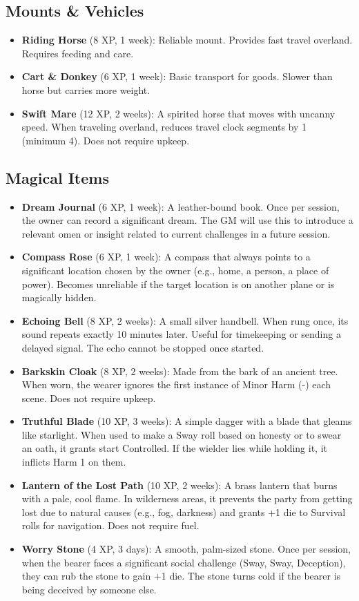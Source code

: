 \documentclass[12pt]{article}
\begin{document}
\subsection*{Mounts \& Vehicles}

\begin{itemize}[leftmargin=*]
  \item \textbf{Riding Horse} (8 XP, 1 week): Reliable mount. Provides fast travel overland. Requires feeding and care.
  \item \textbf{Cart \& Donkey} (6 XP, 1 week): Basic transport for goods. Slower than horse but carries more weight.
  \item \textbf{Swift Mare} (12 XP, 2 weeks): A spirited horse that moves with uncanny speed. When traveling overland, reduces travel clock segments by 1 (minimum 4). Does not require upkeep.
\end{itemize}

\subsection*{Magical Items}

\begin{itemize}[leftmargin=*]
  \item \textbf{Dream Journal} (6 XP, 1 week): A leather-bound book. Once per session, the owner can record a significant dream. The GM will use this to introduce a relevant omen or insight related to current challenges in a future session.
  \item \textbf{Compass Rose} (6 XP, 1 week): A compass that always points to a significant location chosen by the owner (e.g., home, a person, a place of power). Becomes unreliable if the target location is on another plane or is magically hidden.
  \item \textbf{Echoing Bell} (8 XP, 2 weeks): A small silver handbell. When rung once, its sound repeats exactly 10 minutes later. Useful for timekeeping or sending a delayed signal. The echo cannot be stopped once started.
  \item \textbf{Barkskin Cloak} (8 XP, 2 weeks): Made from the bark of an ancient tree. When worn, the wearer ignores the first instance of Minor Harm (-) each scene. Does not require upkeep.
  \item \textbf{Truthful Blade} (10 XP, 3 weeks): A simple dagger with a blade that gleams like starlight. When used to make a Sway roll based on honesty or to swear an oath, it grants start Controlled. If the wielder lies while holding it, it inflicts Harm 1 on them.
  \item \textbf{Lantern of the Lost Path} (10 XP, 2 weeks): A brass lantern that burns with a pale, cool flame. In wilderness areas, it prevents the party from getting lost due to natural causes (e.g., fog, darkness) and grants +1 die to Survival rolls for navigation. Does not require fuel.
  \item \textbf{Worry Stone} (4 XP, 3 days): A smooth, palm-sized stone. Once per session, when the bearer faces a significant social challenge (Sway, Sway, Deception), they can rub the stone to gain +1 die. The stone turns cold if the bearer is being deceived by someone else.
\end{itemize}
\end{document}
